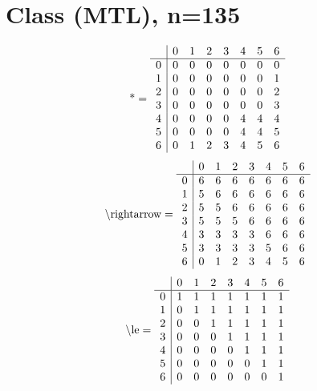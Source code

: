 \documentclass[11pt]{article}
\begin{document}
\section{Class (MTL), n=135}
\[\text{*} = 
\begin{array}{r | r r r r r r r}
 & 0 & 1 & 2 & 3 & 4 & 5 & 6 \\ \hline
0 & 0 & 0 & 0 & 0 & 0 & 0 & 0 \\
1 & 0 & 0 & 0 & 0 & 0 & 0 & 1 \\
2 & 0 & 0 & 0 & 0 & 0 & 0 & 2 \\
3 & 0 & 0 & 0 & 0 & 0 & 0 & 3 \\
4 & 0 & 0 & 0 & 0 & 4 & 4 & 4 \\
5 & 0 & 0 & 0 & 0 & 4 & 4 & 5 \\
6 & 0 & 1 & 2 & 3 & 4 & 5 & 6 \\
\end{array}
\]
\[\text{\textbackslash rightarrow} = 
\begin{array}{r | r r r r r r r}
 & 0 & 1 & 2 & 3 & 4 & 5 & 6 \\ \hline
0 & 6 & 6 & 6 & 6 & 6 & 6 & 6 \\
1 & 5 & 6 & 6 & 6 & 6 & 6 & 6 \\
2 & 5 & 5 & 6 & 6 & 6 & 6 & 6 \\
3 & 5 & 5 & 5 & 6 & 6 & 6 & 6 \\
4 & 3 & 3 & 3 & 3 & 6 & 6 & 6 \\
5 & 3 & 3 & 3 & 3 & 5 & 6 & 6 \\
6 & 0 & 1 & 2 & 3 & 4 & 5 & 6 \\
\end{array}
\]
\[\text{\textbackslash le} = 
\begin{array}{r | r r r r r r r}
 & 0 & 1 & 2 & 3 & 4 & 5 & 6 \\ \hline
0 & 1 & 1 & 1 & 1 & 1 & 1 & 1 \\
1 & 0 & 1 & 1 & 1 & 1 & 1 & 1 \\
2 & 0 & 0 & 1 & 1 & 1 & 1 & 1 \\
3 & 0 & 0 & 0 & 1 & 1 & 1 & 1 \\
4 & 0 & 0 & 0 & 0 & 1 & 1 & 1 \\
5 & 0 & 0 & 0 & 0 & 0 & 1 & 1 \\
6 & 0 & 0 & 0 & 0 & 0 & 0 & 1 \\
\end{array}
\]
\end{document}
